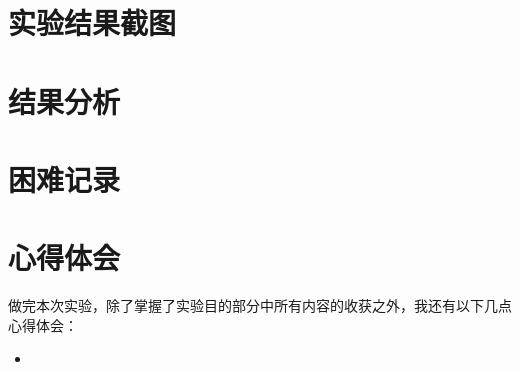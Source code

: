 \documentclass {article}
\begin{document}
	
	\section{实验结果截图}	
	
	
	\section{结果分析}
	
	
	\section{困难记录}
	
	
	\section{心得体会}
		做完本次实验，除了掌握了实验目的部分中所有内容的收获之外，我还有以下几点心得体会：
		\begin{itemize}
			\item
		\end{itemize}
	
\end{document}
